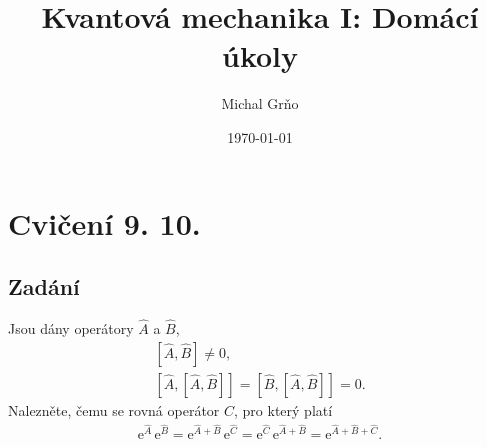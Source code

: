 \documentclass[10pt,a4paper]{article}
\newcommand{\comm}[2]{\left[ #1, #2 \right]}
\newcommand{\const}[1]{\text{#1}}
\newcommand{\e}[1]{\const{e}^{#1}}
\begin{document}
\title{Kvantová mechanika I: Domácí úkoly}
\author{Michal Grňo}
\date{\today}

\maketitle

\section{Cvičení 9. 10.}

\subsection{Zadání}
Jsou dány operátory $\hat A$ a $\hat B$,
\begin{gather*}
    \comm{\hat A}{\hat B} \neq 0,
    \\[5pt]
    \comm{\hat A}{\comm{\hat A}{\hat B}} =
    \comm{\hat B}{\comm{\hat A}{\hat B}} = 0.
\end{gather*}
Nalezněte, čemu se rovná operátor $\hat C$, pro který platí
\begin{gather*}
    \e{\hat A} \, \e{\hat B} =
    \e{\hat A + \hat B} \, \e{\hat C} =
    \e{\hat C} \, \e{\hat A + \hat B} =
    \e{\hat A + \hat B + \hat C}.
\end{gather*}
\end{document}
